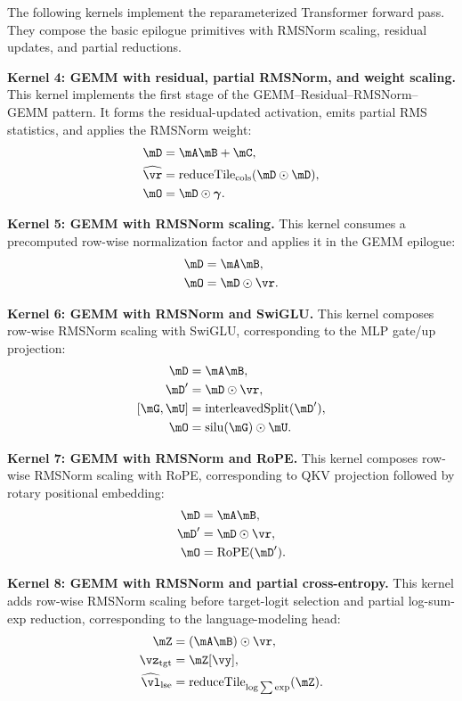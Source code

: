 The following kernels implement the reparameterized Transformer forward pass. They compose the basic epilogue primitives with RMSNorm scaling, residual updates, and partial reductions.

\textbf{Kernel 4: GEMM with residual, partial RMSNorm, and weight scaling.}
This kernel implements the first stage of the GEMM--Residual--RMSNorm--GEMM pattern. It forms the residual-updated activation, emits partial RMS statistics, and applies the RMSNorm weight:
\begin{align*}
\mD &= \mA\mB + \mC, \\
\widehat{\vr} &= \operatorname{reduceTile}_{\mathrm{cols}}(\mD \odot \mD), \\
\mO &= \mD \odot \boldsymbol{\gamma}.
\end{align*}

\textbf{Kernel 5: GEMM with RMSNorm scaling.}
This kernel consumes a precomputed row-wise normalization factor and applies it in the GEMM epilogue:
\begin{align*}
\mD &= \mA\mB, \\
\mO &= \mD \odot \vr.
\end{align*}

\textbf{Kernel 6: GEMM with RMSNorm and SwiGLU.}
This kernel composes row-wise RMSNorm scaling with SwiGLU, corresponding to the MLP gate/up projection:
\begin{align*}
\mD &= \mA\mB, \\
\mD^{\prime} &= \mD \odot \vr, \\
[\mG,\mU] &= \operatorname{interleavedSplit}(\mD^{\prime}), \\
\mO &= \operatorname{silu}(\mG) \odot \mU.
\end{align*}

\textbf{Kernel 7: GEMM with RMSNorm and RoPE.}
This kernel composes row-wise RMSNorm scaling with RoPE, corresponding to QKV projection followed by rotary positional embedding:
\begin{align*}
\mD &= \mA\mB, \\
\mD^{\prime} &= \mD \odot \vr, \\
\mO &= \operatorname{RoPE}(\mD^{\prime}).
\end{align*}

\textbf{Kernel 8: GEMM with RMSNorm and partial cross-entropy.}
This kernel adds row-wise RMSNorm scaling before target-logit selection and partial log-sum-exp reduction, corresponding to the language-modeling head:
\begin{align*}
\mZ &= (\mA\mB) \odot \vr, \\
\vz_{\mathrm{tgt}} &= \mZ[\vy], \\
\widehat{\vl}_{\mathrm{lse}} &= \operatorname{reduceTile}_{\log\sum\exp}(\mZ).
\end{align*}

